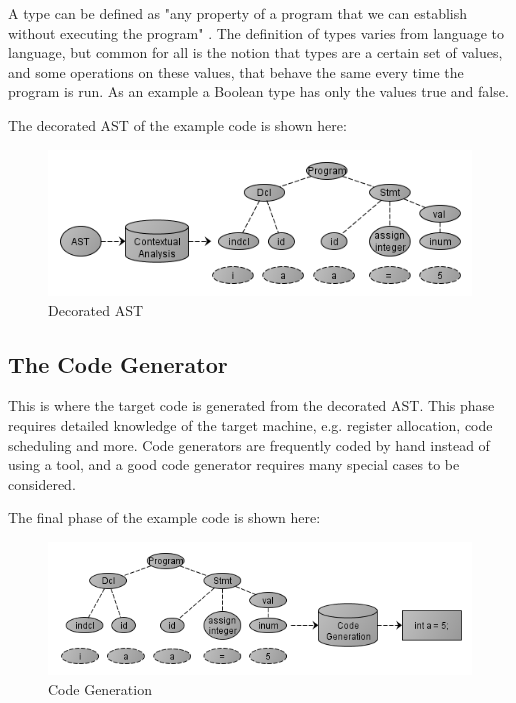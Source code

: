 A type can be defined as "any property of a program that we can establish without executing the program" \cite{Krishnamurthi2007}. The definition of types varies from language to language, but common for all is the notion that types are a certain set of values, and some operations on these values, that behave the same every time the program is run. As an example a Boolean type has only the values true and false. 

The decorated AST of the example code is shown here:

\begin{figure}[ht]
	\centering
		\includegraphics[scale = 0.6]{img/dast.png}
	\caption{Decorated AST}
	\label{fig:dast}
\end{figure}

\subsection{The Code Generator}
This is where the target code is generated from the decorated AST. This phase requires detailed knowledge of the target machine, e.g. register allocation, code scheduling and more. Code generators are frequently coded by hand instead of using a tool, and a good code generator requires many special cases to be considered.

The final phase of the example code is shown here:

\begin{figure}[ht]
	\centering
		\includegraphics[scale = 0.6]{img/codegeneration.png}
	\caption{Code Generation}
	\label{fig:codegen}
\end{figure}

